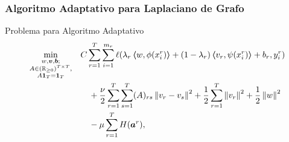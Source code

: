 \documentclass[aspectratio=43]{beamer}
\newcommand{\norm}[1]{\left\lVert#1\right\rVert}
\newcommand{\upper}[1]{\expandafter\MakeUppercase\expandafter{#1}}
\newcommand{\mymat}[1]{\upper{#1}}
\newcommand{\myvec}[1]{\bm{#1}}
\newcommand{\fv}[1]{\myvec{#1}}
\newcommand{\fm}[1]{\mymat{#1}}
\newcommand{\dotp}[2]{\bm{\left\langle} #1, #2 \bm{\right\rangle}}
\newcommand{\ntasks}{T}
\newcommand{\npertask}{m}
\newcommand{\reals}{\mathbb{R}}
\newcommand{\lossf}{\ell}
\begin{document}
\begin{frame}
      \frametitle{Algoritmo Adaptativo para Laplaciano de Grafo}

      \begin{block}{Problema para Algoritmo Adaptativo}
            \begin{equation}\nonumber %
                  \begin{aligned}
                       & \min_{\substack{w, \fv{v}, \fv{b};                                                                                                                                                                                                                                                                                                                              \\  A \in {(\reals_{\geq 0})}^{\ntasks \times \ntasks},  \\ \fm{A} \fv{1}_\ntasks = \fv{1}_\ntasks}}
                       &                                       & C \sum_{r=1}^\ntasks \sum_{i=1}^{\npertask_r} {\lossf(\lambda_r \dotp{w}{\phi({x}_i^r)} + (1 - \lambda_r) \dotp{{v}_r}{\psi({x}_i^r)} + b_r, y_i^r)}                                                                                                                                                                       \\
                       &                                       &                                                                                                                                                      & \quad + \frac{\nu}{2} \sum_{r=1}^\ntasks \sum_{s=1}^\ntasks (A)_{rs} \norm{{v}_r - v_{s}}^2 + \frac{1}{2} \sum_{r=1}^\ntasks \norm{{v}_r}^2 + \frac{1}{2}\norm{{w}}^2 \\
                       &                                       &                                                                                                                                                      & \quad- \mu \sum_{r=1}^\ntasks H(\fv{a}^r) ,
                  \end{aligned}
              \end{equation}
            \end{block}

\end{frame}
\end{document}
